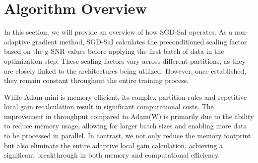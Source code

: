 \begin{table}[!htbp]
\centering
\small %
\setlength{\tabcolsep}{6pt} %
\renewcommand{\arraystretch}{1.3} %
\caption{A100 PCIe 40GB Profile Results. It follows the same setting as Table~\ref{table:rtx3090_warmup_result}, expect for the GPU type.}
\label{table:a100_warmup_result}
\end{table}



\section{Algorithm Overview}

In this section, we will provide an overview of how SGD-SaI operates. As a non-adaptive gradient method, SGD-SaI calculates the preconditioned scaling factor based on the g-SNR values before applying the first batch of data in the optimization step. These scaling factors vary across different partitions, as they are closely linked to the architectures being utilized. However, once established, they remain constant throughout the entire training process.

While Adam-mini is memory-efficient, its complex partition rules and repetitive local gain recalculation result in significant computational costs. The improvement in throughput compared to Adam(W) is primarily due to the ability to reduce memory usage, allowing for larger batch sizes and enabling more data to be processed in parallel. In contrast, we not only reduce the memory footprint but also eliminate the entire adaptive local gain calculation, achieving a significant breakthrough in both memory and computational efficiency.
